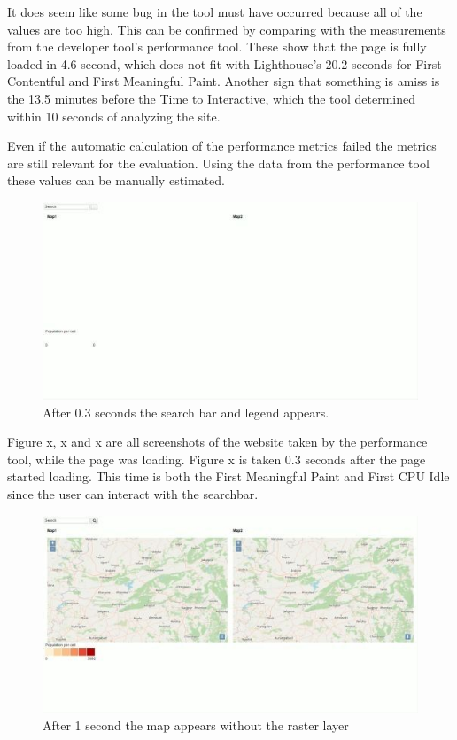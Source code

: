 It does seem like some bug in the tool must have occurred because all of the values are too high. This can be confirmed by comparing with the measurements from the developer tool’s performance tool. These show that the page is fully loaded in 4.6 second, which does not fit with Lighthouse’s 20.2 seconds for First Contentful and First Meaningful Paint. Another sign that something is amiss is the 13.5 minutes before the Time to Interactive, which the tool determined within 10 seconds of analyzing the site. 

Even if the automatic calculation of the performance metrics failed the metrics are still relevant for the evaluation. Using the data from the performance tool these values can be manually estimated. 

\begin{figure} [H]
	\centering
	\includegraphics[width=.8\textwidth]{Pictures/ScreenshotLoading1}
	\caption{After 0.3 seconds the search bar and legend appears.}
	\label{ScreenshotLoading1}
\end{figure}

Figure x, x and x are all screenshots of the website taken by the performance tool, while the page was loading. Figure x is taken 0.3 seconds after the page started loading. This time is both the First Meaningful Paint and First CPU Idle since the user can interact with the searchbar.

\begin{figure} [H]
	\centering
	\includegraphics[width=.8\textwidth]{Pictures/ScreenshotLoading2}
	\caption{After 1 second the map appears without the raster layer}
	\label{ScreenshotLoading2}
\end{figure}

